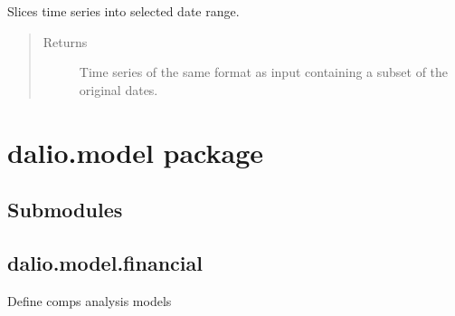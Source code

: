 \documentclass[letterpaper,10pt,english]{sphinxmanual}
\begin{document}
\begin{fulllineitems}

\begin{fulllineitems}
\label{\detokenize{dalio.pipe:dalio.pipe.selection.DateSelect.transform}}
Slices time series into selected date range.
\begin{quote}\begin{description}
\item[{Returns}] \leavevmode
Time series of the same format as input containing a subset of
the original dates.

\end{description}\end{quote}

\end{fulllineitems}


\end{fulllineitems}



\chapter{dalio.model package}
\label{\detokenize{dalio.model:dalio-model-package}}\label{\detokenize{dalio.model::doc}}

\section{Submodules}
\label{\detokenize{dalio.model:submodules}}

\section{dalio.model.financial}
\label{\detokenize{dalio.model:module-dalio.model.financial}}\label{\detokenize{dalio.model:dalio-model-financial}}
Define comps analysis models
\end{document}

